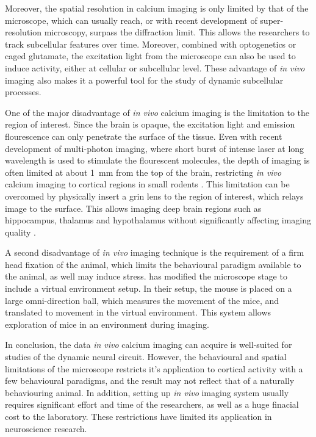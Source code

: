 Moreover, the spatial resolution in calcium imaging is only limited by that of the microscope, which can usually reach, or with recent development of super-resolution microscopy, surpass the diffraction limit. This allows the researchers to track subcellular features over time. Moreover, combined with optogenetics or caged glutamate, the excitation light from the microscope can also be used to induce activity, either at cellular or subcellular level. These advantage of \textit{in vivo} imaging also makes it a powerful tool for the study of dynamic subcellular processes. 

One of the major disadvantage of \textit{in vivo} calcium imaging is the limitation to the region of interest. Since the brain is opaque, the excitation light and emission flourescence can only penetrate the surface of the tissue. Even with recent development of multi-photon imaging, where short burst of intense laser at long wavelength is used to stimulate the flourescent molecules, the depth of imaging is often limited at about \SI{1}{\mm} from the top of the brain, restricting \textit{in vivo} calcium imaging to cortical regions in small rodents \citep{horton13}. This limitation can be overcomed by physically insert a \gls{grin} lens to the region of interest, which relays image to the surface. This allows imaging deep brain regions such as hippocampus, thalamus and hypothalamus without significantly affecting imaging quality \citep{attardo15}.

A second disadvantage of \textit{in vivo} imaging technique is the requirement of a firm head fixation of the animal, which limits the behavioural paradigm available to the animal, as well may induce stress.  has modified the microscope stage to include a virtual environment setup. In their setup, the mouse is placed on a large omni-direction ball, which measures the movement of the mice, and translated to movement in the virtual environment. This system allows exploration of mice in an environment during imaging. 

In conclusion, the data \textit{in vivo} calcium imaging can acquire is well-suited for studies of the dynamic neural circuit. However, the behavioural and spatial limitations of the microscope restricts it's application to cortical activity with a few behavioural paradigms, and the result may not reflect that of a naturally behaviouring animal. In addition, setting up \textit{in vivo} imaging system usually requires significant effort and time of the researchers, as well as a huge finacial cost to the laboratory. These restrictions have limited its application in neuroscience research. 

